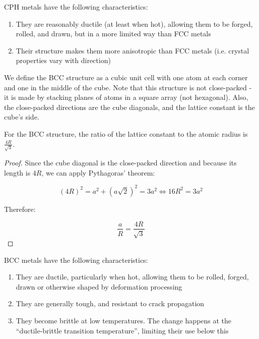 \documentclass{article}
\begin{document}
CPH metals have the following characteristics:

\begin{enumerate}
    \item They are reasonably ductile (at least when hot), allowing them to be forged, rolled, and drawn, but in a more limited way than FCC metals
    \item Their structure makes them more anisotropic than FCC metals (i.e. crystal properties vary with direction)
\end{enumerate}

\begin{definition}
    We define the BCC structure as a cubic unit cell with one atom at each corner and one in the middle of the cube. Note that this structure is not close-packed - it is made by stacking planes of atoms in a square array (not hexagonal). Also, the close-packed directions are the cube diagonals, and the lattice constant is the cube's side.
\end{definition}
    
\begin{proposition}
    For the BCC structure, the ratio of the lattice constant to the atomic radius is $\frac{4R}{\sqrt{3}}$. 
\end{proposition}

\begin{proof}
    Since the cube diagonal is the close-packed direction and because its length is $4R$, we can apply Pythagoras' theorem:

    \[ (4R)^2 = a^2 + (a\sqrt{2})^2 = 3a^2 \iff 16R^2 = 3a^2 \]

    Therefore:

    \[ \frac{a}{R} = \frac{4R}{\sqrt{3}} \]
\end{proof}

BCC metals have the following characteristics:

\begin{enumerate}
    \item They are ductile, particularly when hot, allowing them to be rolled, forged, drawn or otherwise shaped by deformation processing
    \item They are generally tough, and resistant to crack propagation
    \item They become brittle at low temperatures. The change happens at the “ductile-brittle transition temperature”, limiting their use below this
\end{enumerate}
\end{document}
